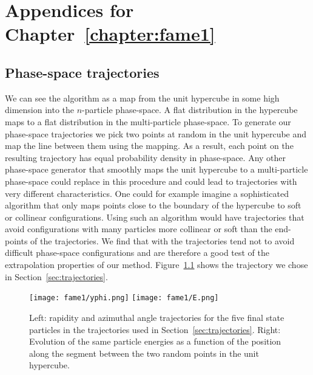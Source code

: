 \documentclass[main.tex]{subfiles}
\begin{document}
\chapter{Appendices for Chapter~\ref{chapter:fame1}}
\label{appendix:fame1}

\section{Phase-space trajectories}\label{appendix:fame1_trajectory_generation}
We can see the {\RAMBO} algorithm as a map from the unit hypercube in some high dimension into the $n$-particle phase-space. A flat distribution in the hypercube maps to a flat distribution in the multi-particle phase-space. 
To generate our phase-space trajectories we pick two points at random in the unit hypercube and map the line between them using the {\RAMBO} mapping. As a result, each point on the resulting trajectory has equal probability density in phase-space. 
Any other phase-space generator that smoothly maps the unit hypercube to a multi-particle phase-space could replace {\RAMBO} in this procedure and could lead to trajectories with very different characteristics. One could for example imagine a 
sophisticated algorithm that only maps points close to the boundary of the hypercube to soft or collinear configurations. Using such an algorithm would have trajectories that avoid configurations with many particles more collinear or soft than 
the end-points of the trajectories. We find that with {\RAMBO} the trajectories tend not to avoid difficult phase-space configurations and are therefore a good test of the extrapolation properties of our method.
Figure~\ref{fig:detectorpath} shows the trajectory we chose in Section~\ref{sec:trajectories}.

\begin{figure}
    \centering
    \texttt{[image: fame1/yphi.png]}
    \texttt{[image: fame1/E.png]}
    \caption{Left: rapidity and azimuthal angle trajectories for the five final state particles in the trajectories used in Section~\ref{sec:trajectories}.
    Right: Evolution of the same particle energies as a function of the position along the segment between the two random points in the unit hypercube.
    }
    \label{fig:detectorpath}
\end{figure}
\end{document}
